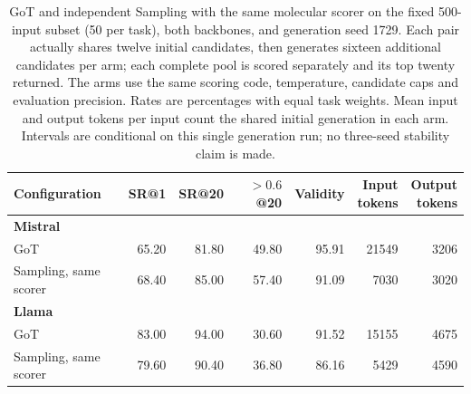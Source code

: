 \begin{table}[!htbp]
\centering
\setlength{\tabcolsep}{4pt}
\caption{GoT and independent Sampling with the same molecular scorer on the fixed 500-input subset (50 per task), both backbones, and generation seed 1729. Each pair actually shares twelve initial candidates, then generates sixteen additional candidates per arm; each complete pool is scored separately and its top twenty returned. The arms use the same scoring code, temperature, candidate caps and evaluation precision. Rates are percentages with equal task weights. Mean input and output tokens per input count the shared initial generation in each arm. Intervals are conditional on this single generation run; no three-seed stability claim is made.}
\label{tab:supp-got-generation}
\begin{tabular}{lrrrrrr}
\toprule
Configuration & SR@1 & SR@20 & $>0.6$ @20 & Validity & \shortstack{Input\\tokens} & \shortstack{Output\\tokens} \\
\midrule
\multicolumn{7}{l}{\textbf{Mistral}} \\
GoT & 65.20 & 81.80 & 49.80 & 95.91 & 21549 & 3206 \\
Sampling, same scorer & 68.40 & 85.00 & 57.40 & 91.09 & 7030 & 3020 \\
\midrule
\multicolumn{7}{l}{\textbf{Llama}} \\
GoT & 83.00 & 94.00 & 30.60 & 91.52 & 15155 & 4675 \\
Sampling, same scorer & 79.60 & 90.40 & 36.80 & 86.16 & 5429 & 4590 \\
\bottomrule
\end{tabular}
\end{table}
